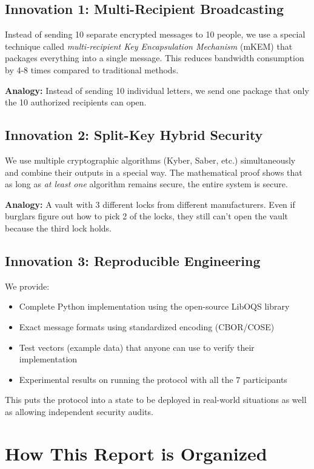 \documentclass[12pt,a4paper]{report}
\begin{document}
\subsection{Innovation 1: Multi-Recipient Broadcasting}

Instead of sending 10 separate encrypted messages to 10 people, we use a special technique called \textit{multi-recipient Key Encapsulation Mechanism} (mKEM) that packages everything into a single message. This reduces bandwidth consumption by 4-8 times compared to traditional methods.

\textbf{Analogy:} Instead of sending 10 individual letters, we send one package that only the 10 authorized recipients can open.

\subsection{Innovation 2: Split-Key Hybrid Security}

We use multiple cryptographic algorithms (Kyber, Saber, etc.) simultaneously and combine their outputs in a special way. The mathematical proof shows that as long as \textit{at least one} algorithm remains secure, the entire system is secure.

\textbf{Analogy:} A vault with 3 different locks from different manufacturers. Even if burglars figure out how to pick 2 of the locks, they still can't open the vault because the third lock holds.

\subsection{Innovation 3: Reproducible Engineering}

We provide:
\begin{itemize}
\item Complete Python implementation using the open-source LibOQS library
\item Exact message formats using standardized encoding (CBOR/COSE)
\item Test vectors (example data) that anyone can use to verify their implementation
\item Experimental results on running the protocol with all the 7 participants
\end{itemize}

This puts the protocol into a state to be deployed in real-world situations as well as allowing independent security audits.

\section{How This Report is Organized}
\end{document}
